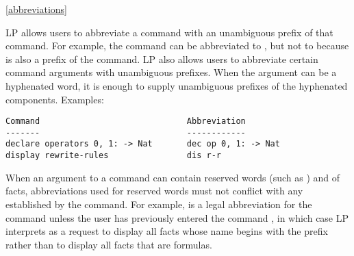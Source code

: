 \ref{abbreviations}

LP allows users to abbreviate a command with an unambiguous prefix of that
command.  For example, the  command can be abbreviated to ,
but not to  because  is also a prefix of the  command.
\p
LP also allows users to abbreviate certain command arguments with unambiguous
prefixes.  When the argument can be a hyphenated word, it is enough to supply
unambiguous prefixes of the hyphenated components.  Examples:
\begin{verbatim}
Command                              Abbreviation
-------                              ------------
declare operators 0, 1: -> Nat       dec op 0, 1: -> Nat
display rewrite-rules                dis r-r
\end{verbatim}
When an argument to a command can contain reserved words (such as
) and  of facts, abbreviations used for 
reserved words must not conflict with any  established by
the  command.  For example,  is a legal abbreviation
for the command  unless the user has previously entered
the command , in which case LP interprets  as
a request to display all facts whose name begins with the prefix 
rather than to display all facts that are formulas.

